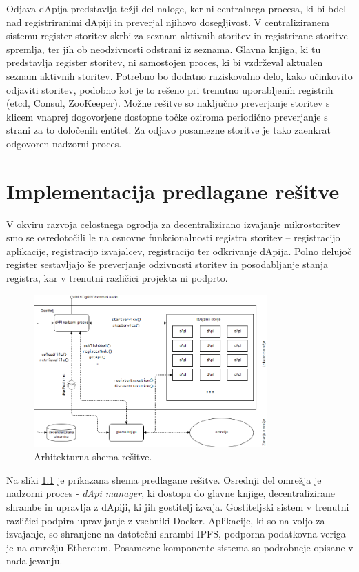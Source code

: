 \documentclass[a4paper, 12pt]{book}
\begin{document}
Odjava dApija predstavlja težji del naloge, ker ni centralnega procesa, ki bi bdel nad registriranimi dApiji in preverjal njihovo dosegljivost.
V centraliziranem sistemu register storitev skrbi za seznam aktivnih storitev in registrirane storitve spremlja, ter jih ob neodzivnosti odstrani iz seznama.
Glavna knjiga, ki tu predstavlja register storitev, ni samostojen proces, ki bi vzdrževal aktualen seznam aktivnih storitev.
Potrebno bo dodatno raziskovalno delo, kako učinkovito odjaviti storitev, podobno kot je to rešeno pri trenutno uporabljenih registrih (etcd, Consul, ZooKeeper).
Možne rešitve so naključno preverjanje storitev s klicem vnaprej dogovorjene dostopne točke oziroma periodično preverjanje s strani za to določenih entitet.
Za odjavo posamezne storitve je tako zaenkrat odgovoren nadzorni proces.

\chapter{Implementacija predlagane rešitve}
\label{ch5}

V okviru razvoja celostnega ogrodja za decentralizirano izvajanje mikrostoritev smo se osredotočili le na osnovne funkcionalnosti registra storitev -- registracijo aplikacije, registracijo izvajalcev, registracijo ter odkrivanje dApija.
Polno delujoč register sestavljajo še preverjanje odzivnosti storitev in posodabljanje stanja registra, kar v trenutni različici projekta ni podprto.

\begin{figure}[h]
	\includegraphics[width=0.8\textwidth]{slike/dApi_sl.png}
	\caption{Arhitekturna shema rešitve.}
	\label{scheme}
\end{figure}

Na sliki \ref{scheme} je prikazana shema predlagane rešitve. Osrednji del omrežja je nadzorni proces - 
\textit{dApi manager}, ki dostopa do glavne knjige, decentralizirane shrambe in upravlja z dApiji, ki jih gostitelj izvaja.
Gostiteljski sistem v trenutni različici podpira upravljanje z vsebniki Docker.
Aplikacije, ki so na voljo za izvajanje, so shranjene na datotečni shrambi IPFS, podporna podatkovna veriga je na omrežju Ethereum. Posamezne komponente sistema so podrobneje opisane v nadaljevanju.
\end{document}
